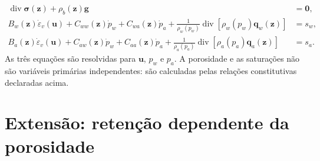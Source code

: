 \documentclass[11pt,a4paper]{article}
\numberwithin{equation}{section}
\newcommand{\Div}{\operatorname{div}}
\begin{document}
\begin{equation}
\boxed{\begin{aligned}
\Div\boldsymbol\sigma(\mathbf z)+\rho_b(\mathbf z)\mathbf g&=\mathbf0,\\[2pt]
B_w(\mathbf z)\dot\varepsilon_v(\mathbf u)
+C_{ww}(\mathbf z)\dot p_w+C_{wa}(\mathbf z)\dot p_a
+\frac{1}{\rho_w(p_w)}\Div[\rho_w(p_w)\mathbf q_w(\mathbf z)]&=s_w,\\[2pt]
B_a(\mathbf z)\dot\varepsilon_v(\mathbf u)
+C_{aw}(\mathbf z)\dot p_w+C_{aa}(\mathbf z)\dot p_a
+\frac{1}{\rho_a(p_a)}\Div[\rho_a(p_a)\mathbf q_a(\mathbf z)]&=s_a.
\end{aligned}}
\end{equation}
As tr\^es equa\c{c}\~oes s\~ao resolvidas para $\mathbf u$, $p_w$
e $p_a$. A porosidade e as satura\c{c}\~oes n\~ao s\~ao vari\'aveis
prim\'arias independentes: s\~ao calculadas pelas rela\c{c}\~oes
constitutivas declaradas acima.

\section{Extens\~ao: reten\c{c}\~ao dependente da porosidade}
\end{document}
